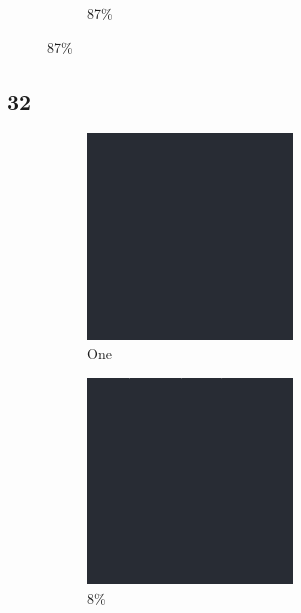 \documentclass[12pt, fleqn]{report}                             %
\theoremstyle{break}                                            %
\begin{document}
\begin{figure}[ht!]
\begin{subfigure}[b]{0.4\linewidth}
          \caption{87\%}
        \end{subfigure}
      \end{figure}


      \clearpage
      \subsection{32}
      \begin{figure}[ht!]
        \centering
        \begin{subfigure}[b]{0.4\linewidth}
          \includegraphics[width=0.6\textwidth]{Images/32/a.png}
          \caption{One}
        \end{subfigure}
        \begin{subfigure}[b]{0.4\linewidth}
          \includegraphics[width=0.6\textwidth]{Images/32/b.png}
          \caption{8\%}
        \end{subfigure}
        \begin{subfigure}[b]{0.4\linewidth}

\end{subfigure}
\end{figure}
\end{document}
